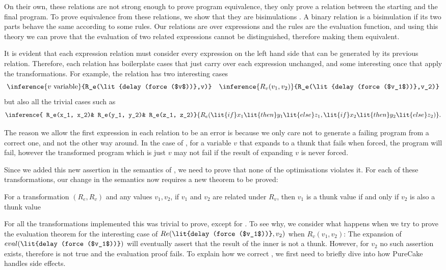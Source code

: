 On their own, these relations are not strong enough to prove program
equivalence, they only prove a relation between the starting and the final
program. To prove equivalence from these relations, we show that they are
bisimulations \cite{howe1996proving}. A binary relation is a bisimulation if its
two parts behave the same according to some rules. Our relations are over
\ThunkLang{} expressions and the rules are the evaluation function, and using
this theory we can prove that the evaluation of two related expressions cannot
be distinguished, therefore making them equivalent.

It is evident that each expression relation must consider every expression on
the left hand side that can be generated by its previous relation. Therefore,
each relation has boilerplate cases that just carry over each expression
unchanged, and some interesting once that apply the transformations. For
example, the  relation has two interesting cases
\[
\inference{v\ \text{variable}}{R_e(\lit{delay (force ($v$))},v)}
\quad
\inference{R_v(v_1,v_2)}{R_e(\lit{delay (force ($v_1$))},v_2)}
\]
but also all the trivial
cases such as \[\inference{
  R_e(x_1, x_2)&
  R_e(y_1, y_2)&
  R_e(z_1, z_2)}
{R_e(\lit{if } x_1 \lit{ then } y_1 \lit{ else } z_1,
\lit{if } x_2 \lit{ then } y_2 \lit{ else } z_2)}.\]

The reason we allow the first expression in each relation to be an error is
because we only care not to generate a failing program from a correct one, and
not the other way around. In the case of , for a variable $v$
that expands to a thunk that fails when forced, the program  will fail, however the transformed program which is just $v$ may not
fail if the result of expanding $v$ is never forced.

Since we added this new assertion in the semantics of , we need to
prove that none of the optimisations violates it. For each of these
transformations, our change in the semantics now requires a new theorem to be
proved:

\begin{theorem} For a transformation $(R_e,R_v)$ and any
values $v_1,v_2$, if $v_1$ and $v_2$ are related under $R_v$, then $v_1$ is a
thunk value if and only if $v_2$ is also a thunk value
\end{theorem}

For all the transformations implemented this was trivial to prove, except for
. To see why, we consider what happens when we try to prove
the evaluation theorem for the interesting case of $Re(\lit{delay (force
($v_1$))}, v_2)$ when $R_v(v_1,v_2)$: The expansion of $eval(\lit{delay (force
($v_1$))})$ will eventually assert that the result of the inner  is
not a thunk. However, for $v_2$ no such assertion exists, therefore
\textbf{} is not true and the evaluation proof fails. To
explain how we correct , we first need to briefly dive into
how PureCake handles side effects.

